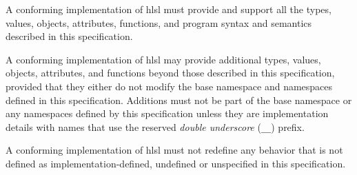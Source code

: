 
\p A conforming implementation of \acrshort{hlsl} must provide and support all
the types, values, objects, attributes, functions, and program syntax and
semantics described in this specification.

\p A conforming implementation of \acrshort{hlsl} may provide additional types,
values, objects, attributes, and functions beyond those described in this
specification, provided that they either do not modify the base namespace and
namespaces defined in this specification. Additions must not be part of the base
namespace or any namespaces defined by this specification unless they are
implementation details with names that use the reserved \textit{double
underscore} (\texttt{\_\_}) prefix.

\p A conforming implementation of \acrshort{hlsl} must not redefine any behavior
that is not defined as implementation-defined, undefined or unspecified in this
specification.
